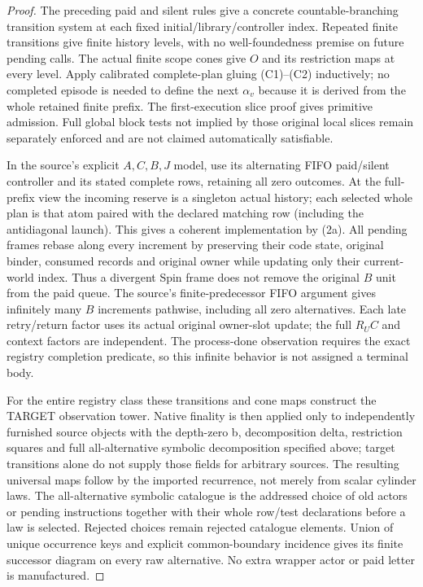\documentclass{article}
\begin{document}
\begin{proof}
The preceding paid and silent rules give a concrete countable-branching transition system at each fixed initial/library/controller index. Repeated finite transitions give finite history levels, with no well-foundedness premise on future pending calls. The actual finite scope cones give $O$ and its restriction maps at every level. Apply calibrated complete-plan gluing (C1)--(C2) inductively; no completed episode is needed to define the next $\alpha_v$ because it is derived from the whole retained finite prefix. The first-execution slice proof gives primitive admission. Full global block tests not implied by those original local slices remain separately enforced and are not claimed automatically satisfiable.

In the source's explicit $A,C,B,J$ model, use its alternating FIFO paid/silent controller and its stated complete rows, retaining all zero outcomes. At the full-prefix view the incoming reserve is a singleton actual history; each selected whole plan is that atom paired with the declared matching row (including the antidiagonal launch). This gives a coherent implementation by (2a). All pending frames rebase along every increment by preserving their code state, original binder, consumed records and original owner while updating only their current-world index. Thus a divergent Spin frame does not remove the original $B$ unit from the paid queue. The source's finite-predecessor FIFO argument gives infinitely many $B$ increments pathwise, including all zero alternatives. Each late retry/return factor uses its actual original owner-slot update; the full $R_UC$ and context factors are independent. The process-done observation requires the exact registry completion predicate, so this infinite behavior is not assigned a terminal body.

For the entire registry class these transitions and cone maps construct the TARGET observation tower. Native finality is then applied only to independently furnished source objects with the depth-zero b, decomposition delta, restriction squares and full all-alternative symbolic decomposition specified above; target transitions alone do not supply those fields for arbitrary sources. The resulting universal maps follow by the imported recurrence, not merely from scalar cylinder laws. The all-alternative symbolic catalogue is the addressed choice of old actors or pending instructions together with their whole row/test declarations before a law is selected. Rejected choices remain rejected catalogue elements. Union of unique occurrence keys and explicit common-boundary incidence gives its finite successor diagram on every raw alternative. No extra wrapper actor or paid letter is manufactured.
\end{proof}
\end{document}
